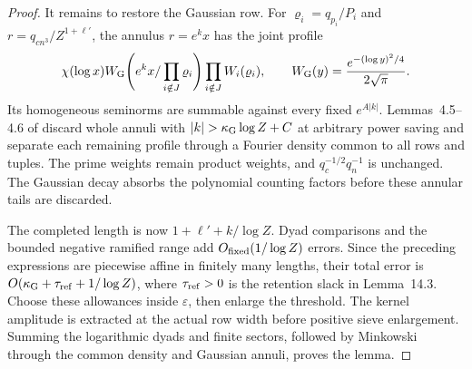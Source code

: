 \begin{proof}
It remains to restore the Gaussian row.  For
\(\varrho_i=q_{p_i}/P_i\) and \(r=q_{cn^3}/Z^{1+\ell'}\), the
annulus \(r=e^kx\) has the joint profile
\[
 \chi(\log x)W_{\rm G}\!\left(
       e^kx/\prod_{i\notin J}\varrho_i\right)
 \prod_{i\notin J}W_i(\varrho_i),
 \qquad W_{\rm G}(y)=\frac{e^{-(\log y)^2/4}}{2\sqrt\pi}.
\]
Its homogeneous seminorms are summable against every fixed
\(e^{A|k|}\).  Lemmas~4.5--4.6 of \cite{OAI26} discard whole
annuli with \(|k|>\kappa_{\rm G}\log Z+C\) at arbitrary power
saving and separate each remaining profile through a Fourier
density common to all rows and tuples.  The prime weights remain
product weights, and \(q_c^{-1/2}q_n^{-1}\) is unchanged.
The Gaussian decay absorbs the polynomial counting factors before
these annular tails are discarded.

The completed length is now \(1+\ell'+k/\log Z\).
Dyad comparisons and the bounded negative ramified range add
\(O_{\rm fixed}(1/\log Z)\) errors.  Since the preceding expressions
are piecewise affine in finitely many lengths, their total error
is \(O(\kappa_{\rm G}+\tau_{\rm ref}+1/\log Z)\), where
\(\tau_{\rm ref}>0\) is the retention slack in Lemma~14.3.
Choose these allowances inside \(\varepsilon\), then enlarge the
threshold.  The kernel amplitude is extracted at the actual row
width before positive sieve enlargement.  Summing the logarithmic
dyads and finite sectors, followed by Minkowski through the common
density and Gaussian annuli, proves the lemma.
\end{proof}
